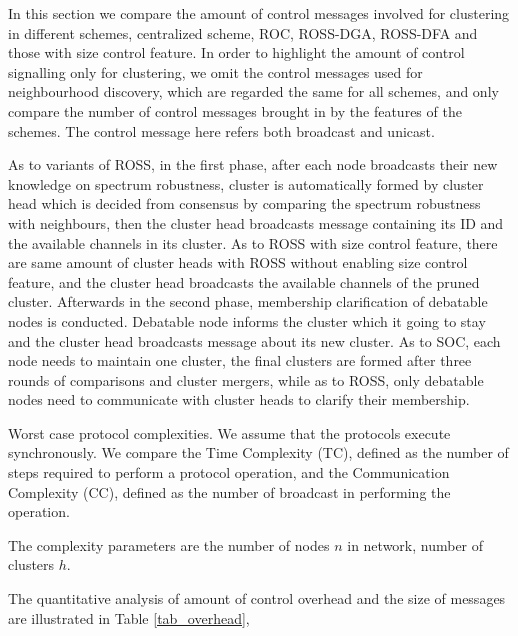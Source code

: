 In this section we compare the amount of control messages involved for clustering in different schemes, \eg centralized scheme, ROC, ROSS-DGA, ROSS-DFA and those with size control feature.
In order to highlight the amount of control signalling only for clustering, we omit the control messages used for neighbourhood discovery, which are regarded the same for all schemes, and only compare the number of control messages brought in by the features of the schemes. 
The control message here refers both broadcast and unicast.

As to variants of ROSS, in the first phase, after each node broadcasts their new knowledge on spectrum robustness, cluster is automatically formed by cluster head which is decided from consensus by comparing the spectrum robustness with neighbours, then the cluster head broadcasts message containing its ID and the available channels in its cluster.
As to ROSS with size control feature, there are same amount of cluster heads with ROSS without enabling size control feature, and the cluster head broadcasts the available channels of the pruned cluster.
Afterwards in the second phase, membership clarification of debatable nodes is conducted.
Debatable node informs the cluster which it going to stay and the cluster head broadcasts message about its new cluster.
As to SOC, each node needs to maintain one cluster, the final clusters are formed after three rounds of comparisons and cluster mergers, while as to ROSS, only debatable nodes need to communicate with cluster heads to clarify their membership.

Worst case protocol complexities.
We assume that the protocols execute synchronously. 
We compare the Time Complexity (\gls{TC}), defined as the number of steps required to perform a protocol operation, and the Communication Complexity (CC), defined as the number of broadcast in performing the operation.

The complexity parameters are the number of nodes $n$ in network, number of clusters $h$.

The quantitative analysis of amount of control overhead and the size of messages are illustrated in Table \ref{tab_overhead}, 

